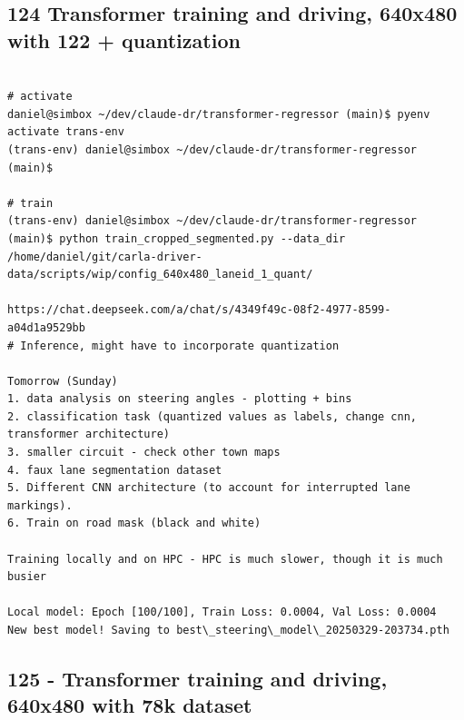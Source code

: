 \subsection{124 Transformer training and driving, 640x480 with 122 + quantization}
\label{app_res:124}

\begin{verbatim}

# activate
daniel@simbox ~/dev/claude-dr/transformer-regressor (main)$ pyenv activate trans-env 
(trans-env) daniel@simbox ~/dev/claude-dr/transformer-regressor (main)$ 

# train
(trans-env) daniel@simbox ~/dev/claude-dr/transformer-regressor (main)$ python train_cropped_segmented.py --data_dir /home/daniel/git/carla-driver-data/scripts/wip/config_640x480_laneid_1_quant/ 

https://chat.deepseek.com/a/chat/s/4349f49c-08f2-4977-8599-a04d1a9529bb
# Inference, might have to incorporate quantization

Tomorrow (Sunday)
1. data analysis on steering angles - plotting + bins
2. classification task (quantized values as labels, change cnn, transformer architecture)
3. smaller circuit - check other town maps
4. faux lane segmentation dataset
5. Different CNN architecture (to account for interrupted lane markings).
6. Train on road mask (black and white)

Training locally and on HPC - HPC is much slower, though it is much busier

Local model: Epoch [100/100], Train Loss: 0.0004, Val Loss: 0.0004
New best model! Saving to best\_steering\_model\_20250329-203734.pth

\end{verbatim}

\subsection{125 - Transformer training and driving, 640x480 with 78k dataset}
\label{app_res:125}

